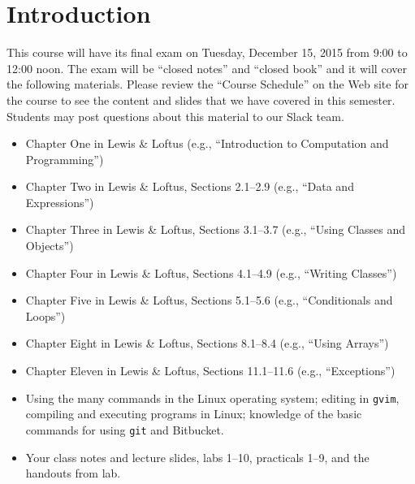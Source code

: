


\section*{Introduction}

This course will have its final exam on Tuesday, December 15, 2015 from 9:00 to 12:00 noon. The exam will be ``closed
notes'' and ``closed book'' and it will cover the following materials. Please review the ``Course Schedule'' on the Web
site for the course to see the content and slides that we have covered in this semester. Students may post questions about
this material to our Slack team.

\begin{itemize}

  \itemsep 0in

  \item Chapter One in Lewis \& Loftus (e.g., ``Introduction to Computation and Programming'')

  \item Chapter Two in Lewis \& Loftus, Sections 2.1--2.9 (e.g., ``Data and Expressions'')

  \item Chapter Three in Lewis \& Loftus, Sections 3.1--3.7 (e.g., ``Using Classes and Objects'')

  \item Chapter Four in Lewis \& Loftus, Sections 4.1--4.9 (e.g., ``Writing Classes'')

  \item Chapter Five in Lewis \& Loftus, Sections 5.1--5.6 (e.g., ``Conditionals and Loops'')

  \item Chapter Eight in Lewis \& Loftus, Sections 8.1--8.4 (e.g., ``Using Arrays'')

  \item Chapter Eleven in Lewis \& Loftus, Sections 11.1--11.6 (e.g., ``Exceptions'')

  \item Using the many commands in the Linux operating system; editing in {\tt gvim}, compiling and executing
    programs in Linux; knowledge of the basic commands for using {\tt git} and Bitbucket.

  \item Your class notes and lecture slides, labs 1--10, practicals 1--9, and the handouts from lab.

\end{itemize}

